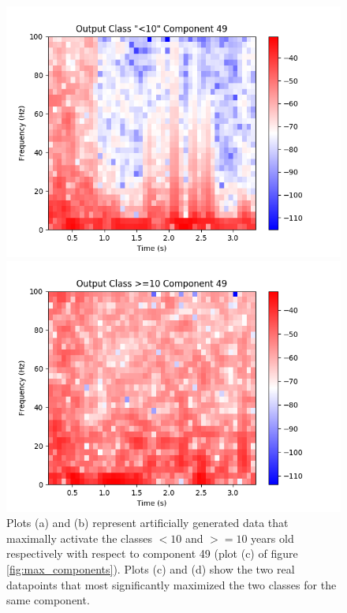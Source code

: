 \documentclass[utf8]{frontiersSCNS} %
\begin{document}
\begin{figure}
\begin{minipage}{0.45\textwidth}
    \includegraphics[width=\linewidth]{max_act/real_0_49.png}
  \end{minipage}
  \hspace*{\fill} 
  \begin{minipage}{0.45\textwidth}
    \includegraphics[width=\linewidth]{max_act/real_1_49.png}
  \end{minipage}
  \caption{Plots (a) and (b) represent artificially generated data that maximally activate the classes $<10$ and $>=10$ years old respectively with respect to component 49 (plot (c) of figure \ref{fig:max_components}). Plots (c) and (d) show the two real datapoints that most significantly maximized the two classes for the same component.} \label{fig:component_49}
\end{figure}
\end{document}
